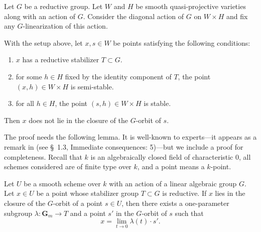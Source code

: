 \documentclass[11pt,reqno, letterpaper]{amsart}
\renewcommand{\k}{k}
\renewcommand{\to}{{\longrightarrow}}
\numberwithin{equation}{section}
\newcommand{\G}{\mathbf G}
\begin{document}
  Let $G$ be a reductive group.
  Let $W$ and $H$ be smooth quasi-projective varieties along with an action of $G$.
  Consider the diagonal action of $G$ on $W \times H$ and fix any $G$-linearization of this action.
\begin{proposition}\label{prop:gitproduct}
  With the setup above, let $x, s \in W$ be points satisfying the following conditions:
  \begin{enumerate}
  \item $x$ has a reductive stabilizer $T \subset G$.
  \item for some $h \in H$ fixed by the identity component of $T$, the point $(x, h) \in W \times H$ is semi-stable.
  \item for all $h \in H$, the point $(s, h) \in W \times H$ is stable.
  \end{enumerate}
  Then $x$ does not lie in the closure of the $G$-orbit of $s$.
\end{proposition}
The proof needs the following lemma.
It is well-known to experts---it appears as a remark in \cite{alp.hal.ryd:20} (see \S~1.3, Immediate consequences: 5)---but we include a proof for completeness.
Recall that $\k$ is an algebraically closed field of characteristic 0, all schemes considered are of finite type over $\k$, and a point means a $\k$-point.
\begin{lemma}\label{prop:oneparam}
  Let \(U\) be a smooth scheme over $\k$ with an action of a linear algebraic group $G$.
  Let $x \in U$ be a point whose stabilizer group $T \subset G$ is reductive.
  If $x$ lies in the closure of the $G$-orbit of a point $s \in U$, then there exists a one-parameter subgroup $\lambda \colon \G_m \to T$ and a point $s'$ in the $G$-orbit of $s$ such that
  \[ x = \lim_{t \to 0} \lambda(t) \cdot s'.\]
\end{lemma}
\end{document}
